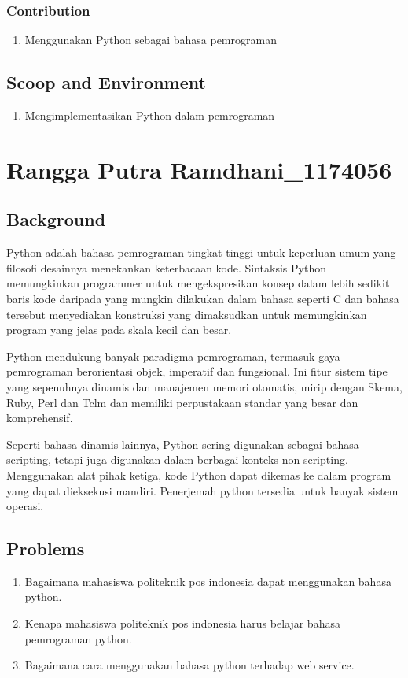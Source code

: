 \subsubsection{Contribution}
\begin{enumerate}
\item Menggunakan Python sebagai bahasa pemrograman
\end{enumerate}
\subsection{Scoop and Environment}
\begin{enumerate}
\item Mengimplementasikan Python dalam pemrograman
\end{enumerate}
\section{Rangga Putra Ramdhani\_1174056}
\subsection{Background}
	\par
	Python adalah bahasa pemrograman tingkat tinggi untuk keperluan umum yang filosofi desainnya menekankan keterbacaan kode. Sintaksis Python memungkinkan programmer untuk mengekspresikan konsep dalam lebih sedikit baris kode daripada yang mungkin dilakukan dalam bahasa seperti C dan bahasa tersebut menyediakan konstruksi yang dimaksudkan untuk memungkinkan program yang jelas pada skala kecil dan besar.
	\par
	Python mendukung banyak paradigma pemrograman, termasuk gaya pemrograman berorientasi objek, imperatif dan fungsional. Ini fitur sistem tipe yang sepenuhnya dinamis dan manajemen memori otomatis, mirip dengan Skema, Ruby, Perl dan Tclm dan memiliki perpustakaan standar yang besar dan komprehensif.
	\par
	Seperti bahasa dinamis lainnya, Python sering digunakan sebagai bahasa scripting, tetapi juga digunakan dalam berbagai konteks non-scripting. Menggunakan alat pihak ketiga, kode Python dapat dikemas ke dalam program yang dapat dieksekusi mandiri. Penerjemah python tersedia untuk banyak sistem operasi.

\subsection{Problems}
	\begin{enumerate}
		\item Bagaimana mahasiswa politeknik pos indonesia dapat menggunakan bahasa python.
		\item Kenapa mahasiswa politeknik pos indonesia harus belajar bahasa pemrograman python.
		\item Bagaimana cara menggunakan bahasa python terhadap web service.
	\end{enumerate}

